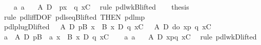 \begin{isabellebody}
\ \ \isamarkupfalse%
\ a{}\ a{}\ \isamarkupfalse%
\ {\isachardoublequote}{\isasymturnstile}\ A\ {\isasymlongrightarrow}\isactrlsub D\ {\isacharbrackleft}{\isacharhash}\ p{\isacharbrackright}{\isacharparenleft}{\isasymlambda}x{\isachardot}\ {\isacharbrackleft}{\isacharhash}\ q\ x{\isacharbrackright}C{\isacharparenright}{\isachardoublequote}\ \isamarkupfalse%
\ {\isacharparenleft}rule\ pdl{\isacharunderscore}wkB{\isacharunderscore}lifted{}{\isacharparenright}\isanewline
\ \ \isamarkupfalse%
\ {\isacharquery}thesis\ \isamarkupfalse%
\ {\isacharparenleft}rule\ pdl{\isacharunderscore}iffD{}{\isacharbrackleft}OF\ pdl{\isacharunderscore}seqB{\isacharunderscore}lifted{}{\isacharcomma}\ THEN\ pdl{\isacharunderscore}mp{\isacharbrackright}{\isacharparenright}\isanewline
\isamarkupfalse%
\isanewline
\isanewline
\isamarkupfalse%
\ pdl{\isacharunderscore}plugD{\isacharunderscore}lifted{}{\isacharcolon}\ {\isachardoublequote}{\isasymlbrakk}\ {\isasymturnstile}\ A\ {\isasymlongrightarrow}\isactrlsub D\ {\isasymlangle}p{\isasymrangle}B{\isacharsemicolon}\ {\isasymforall}x{\isachardot}\ {\isasymturnstile}\ B\ x\ {\isasymlongrightarrow}\isactrlsub D\ {\isasymlangle}q\ x{\isasymrangle}C{\isasymrbrakk}\ {\isasymLongrightarrow}\ {\isasymturnstile}\ A\ {\isasymlongrightarrow}\isactrlsub D\ {\isasymlangle}do\ {\isacharbraceleft}x{\isasymleftarrow}p{\isacharsemicolon}\ q\ x{\isacharbraceright}{\isasymrangle}C{\isachardoublequote}\isanewline
\isamarkupfalse%
\ {\isacharminus}\isanewline
\ \ \isamarkupfalse%
\ a{}{\isacharcolon}\ {\isachardoublequote}{\isasymturnstile}\ A\ {\isasymlongrightarrow}\isactrlsub D\ {\isasymlangle}p{\isasymrangle}B{\isachardoublequote}\ \ a{}{\isacharcolon}\ {\isachardoublequote}{\isasymforall}x{\isachardot}\ {\isasymturnstile}\ B\ x\ {\isasymlongrightarrow}\isactrlsub D\ {\isasymlangle}q\ x{\isasymrangle}C{\isachardoublequote}\isanewline
\ \ \isamarkupfalse%
\ a{}\ a{}\ \isamarkupfalse%
\ {\isachardoublequote}{\isasymturnstile}\ A\ {\isasymlongrightarrow}\isactrlsub D\ {\isasymlangle}x{\isasymleftarrow}p{\isasymrangle}{\isasymlangle}q\ x{\isasymrangle}C{\isachardoublequote}\ \isamarkupfalse%
\ {\isacharparenleft}rule\ pdl{\isacharunderscore}wkD{\isacharunderscore}lifted{}{\isacharparenright}\isanewline
\ \ \isamarkupfalse%

\end{isabellebody}
